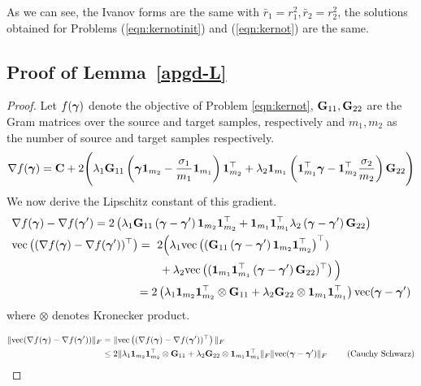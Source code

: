 As we can see, the Ivanov forms are the same with $\bar{r}_1=r_1^2, \bar{r}_2=r_2^2$, the solutions obtained for Problems (\ref{eqn:kernotinit}) and (\ref{eqn:kernot}) are the same.


\subsection[Deriving Step-Size for APGD-based Algorithm]{Proof of Lemma~\ref{apgd-L}}\label{proof:lemma-solve} 
\Lderiv*
\begin{proof}
Let $f(\bm{\gamma})$ denote the objective of Problem \ref{eqn:kernot}, $\mathbf{G}_{11}, \mathbf{G}_{22}$ are the Gram matrices over the source and target samples, respectively and $m_1, m_2$ as the number of source and target samples respectively.
\begin{align*}
    \nabla f(\bm{\gamma}) =\mathbf{C}+2\Bigg(\lambda_1 \mathbf{G}_{11}\left(\bm{\gamma} \mathbf{1}_{m_2}-\frac{\sigma_1}{m_1}\mathbf{1}_{m_1}\right)\mathbf{1}_{m_2}^\top +\lambda_2\mathbf{1}_{m_1}\left(\mathbf{1}_{m_1}^\top \bm{\gamma} - \mathbf{1}_{m_2}^\top\frac{\sigma_2}{m_2}\right) \mathbf{G}_{22}\Bigg)
\end{align*} 
We now derive the Lipschitz constant of this gradient.
\begin{align*}
&\nabla f(\bm{\gamma})-\nabla f(\bm{\gamma}')  = 2\left( \lambda_1\mathbf{G}_{11}\left(\bm{\gamma}-\bm{\gamma}'\right)\mathbf{1}_{m_2}\mathbf{1}_{m_2}^\top+\mathbf{1}_{m_1}\mathbf{1}_{m_1}^\top \lambda_2\left(\bm{\gamma}-\bm{\gamma}'\right) \mathbf{G}_{22}\right)\\
&\textup{vec}\left((\nabla f(\bm{\gamma})-\nabla f(\bm{\gamma}'))^\top\right)  =\  2 \Big(\lambda_1\textup{vec}\left((\mathbf{G}_{11}\left(\bm{\gamma}-\bm{\gamma}'\right)\mathbf{1}_{m_2}\mathbf{1}_{m_2}^\top\right)^\top) \nonumber\\
&\qquad\qquad\qquad\qquad\qquad\quad\qquad+
 \lambda_2\textup{vec}\left(( \mathbf{1}_{m_1}\mathbf{1}_{m_1}^\top \left(\bm{\gamma}-\bm{\gamma}'\right) \mathbf{G}_{22})^\top\right)\Big)\\
& \qquad\qquad\qquad\qquad\qquad \quad =2\left(\lambda_1\mathbf{1}_{m_2}\mathbf{1}_{m_2}^\top \otimes \mathbf{G}_{11} +\lambda_2\mathbf{G}_{22} \otimes \mathbf{1}_{m_1}\mathbf{1}_{m_1}^\top\right)\textup{vec}(\bm{\gamma}-\bm{\gamma}')
\end{align*}
where $\otimes$ denotes Kronecker product.

\begin{align*}
    \|\textup{vec}(\nabla f(\bm{\gamma})-\nabla f(\bm{\gamma}'))\|_F&=\|\textup{vec}\left((\nabla f(\bm{\gamma})-\nabla f(\bm{\gamma}'))^\top\right)\|_F\\
    &\leq 2\|\lambda_1\mathbf{1}_{m_2}\mathbf{1}_{m_2}^\top \otimes \mathbf{G}_{11} +\lambda_2\mathbf{G}_{22} \otimes \mathbf{1}_{m_1}\mathbf{1}_{m_1}^\top\|_F \|\textup{vec}(\bm{\gamma}-\bm{\gamma}')\|_F \ \tag{Cauchy Schwarz}
\end{align*}


\end{proof}
